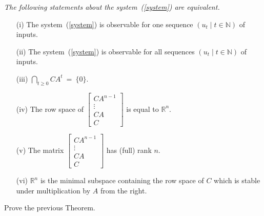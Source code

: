 \documentclass[12pt]{amsart}
\begin{document}
{\it 
The following statements about the system~{\rm (\ref{system})} are equivalent.
\begin{enumerate}
 \item[{\rm(i)}] 
      The system~{\rm (\ref{system})}  is observable for one sequence 
      $(u_t\mid t\in{\mathbb N})$ of inputs.
 \item[{\rm(ii)}]  
      The system~{\rm (\ref{system})} is observable for all sequences 
      $(u_t\mid t\in{\mathbb N})$ of inputs.
 \item[{\rm(iii)}]  
      ${\displaystyle \bigcap_{t\geq 0} C A^t\ =\ \{0\}}$.
 \item[{\rm(iv)}]  
      The row space of ${\displaystyle 
       \left[\begin{array}{c}CA^{n-1}\\\vdots\\CA\\C\end{array}\right]}$
      is equal to ${\mathbb R}^n$.
 \item[{\rm(v)}]  
      The matrix ${\displaystyle 
           \left[\begin{array}{c}CA^{n-1}\\\vdots\\CA\\C\end{array}\right]}$
      has (full) rank $n$.
 \item[{\rm(vi)}]  
      ${\mathbb R}^n$ is the minimal subspace containing 
      the row space of $C$ which is stable under multiplication 
      by $A$ from the right.
\end{enumerate}
}\medskip



Prove the previous Theorem.
\end{document}
